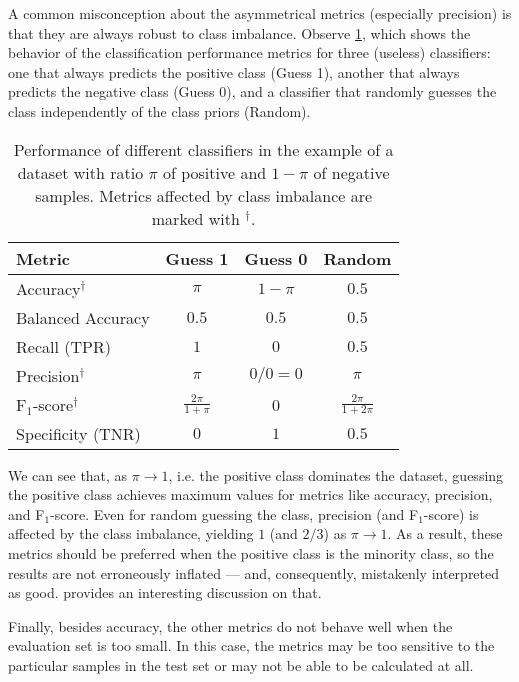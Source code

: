 A common misconception about the asymmetrical metrics (especially precision) is that they
are always robust to class imbalance.  Observe \cref{tab:classification-metrics-ex}, which shows
the behavior of the classification performance metrics for three (useless) classifiers: one
that always predicts the positive class (Guess 1), another that always predicts the
negative class (Guess 0), and a classifier that randomly guesses the class independently
of the class priors (Random).

\begin{table}
  \caption{
    Performance of different classifiers in the example of a dataset with ratio $\pi$ of
    positive and $1-\pi$ of negative samples.  Metrics affected by class imbalance are
    marked with $^\dagger$.
  }
  \label{tab:classification-metrics-ex}
  \centering
  \begin{tabular}{l c c c}
    \toprule
    \textbf{Metric} & \textbf{Guess 1} & \textbf{Guess 0} & \textbf{Random} \\
    \midrule
    Accuracy$^\dagger$ & $\pi$ & $1 - \pi$ & $0.5$ \\
    Balanced Accuracy & $0.5$ & $0.5$ & $0.5$ \\
    Recall (TPR) & $1$ & $0$ & $0.5$ \\
    Precision$^\dagger$ & $\pi$ & $0/0 = 0$ & $\pi$ \\
    F$_1$-score$^\dagger$ & $\frac{2 \pi}{1 + \pi}$ & 0 & $\frac{2 \pi}{1 + 2\pi}$ \\
    Specificity (TNR) & $0$ & $1$ & $0.5$ \\
    \bottomrule
  \end{tabular}
\end{table}

We can see that, as $\pi \to 1$, i.e. the positive class dominates the dataset, guessing
the positive class achieves maximum values for metrics like accuracy, precision, and
F$_1$-score.  Even for random guessing the class, precision (and F$_1$-score) is affected
by the class imbalance, yielding $1$ (and $2/3$) as $\pi \to 1$.  As a result, these
metrics should be preferred when the positive class is the minority class, so the results
are not erroneously inflated --- and, consequently, mistakenly interpreted as good.
\textcite{Williams2021} provides an interesting discussion on
that.

Finally, besides accuracy, the other metrics do not behave well when the evaluation set is
too small.  In this case, the metrics may be too sensitive to the particular samples in
the test set or may not be able to be calculated at all.

